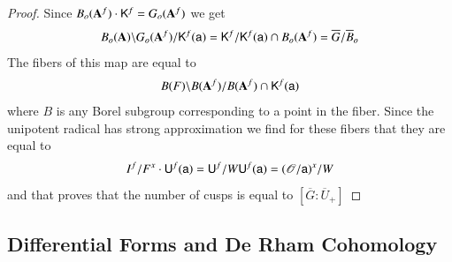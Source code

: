 \begin{proof}
Since $B_{o}(\mathbf{A}^{f})\cdot \mathsf{K}^{f}=G_{o}(\mathbf{A}^{f})$ we get
$$
B_{o}(\mathbf{A})\backslash G_{o}(\mathbf{A}^{f})/\mathsf{K}^{f}(\mathsf{a})=\mathsf{K}^{f}/\mathsf{K}^{f}(\mathsf{a})\cap B_{o}(\mathbf{A}^{f})=\overline{G}/\overline{B}_{o}
$$
The fibers of this map are equal to
$$
B(F)\backslash B(\mathbf{A}^{f})/B(\mathbf{A}^{f})\cap \mathsf{K}^{f}(\mathsf{a})
$$
where $B$ is any Borel subgroup corresponding to a point in the fiber. Since the unipotent radical has strong approximation we find for these fibers that they are equal to
$$
I^{f}/F^{x}\cdot \mathsf{U}^{f}(\mathsf{a})=\mathsf{U}^{f}/W\mathsf{U}^{f}(\mathsf{a})=(\mathscr{O}/\mathsf{a})^{x}/W
$$
and that proves that the number of cusps is equal to $[\overline{G}:\overline{U}_{+}]$
\end{proof}

\subsection{Differential Forms and De Rham Cohomology}\label{art2-sec1.4}


